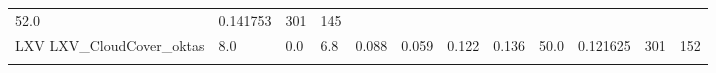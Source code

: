 \documentclass[11pt]{article}
\begin{document}
\begin{longtable}[]{@{}llllllllllll@{}}
\begin{minipage}[t]{0.05\columnwidth}
52.0\strut
\end{minipage} & \begin{minipage}[t]{0.05\columnwidth}\raggedright\strut
0.141753\strut
\end{minipage} & \begin{minipage}[t]{0.05\columnwidth}\raggedright\strut
301\strut
\end{minipage} & \begin{minipage}[t]{0.07\columnwidth}\raggedright\strut
145\strut
\end{minipage}\tabularnewline
\begin{minipage}[t]{0.18\columnwidth}\raggedright\strut
LXV LXV\_CloudCover\_oktas\strut
\end{minipage} & \begin{minipage}[t]{0.04\columnwidth}\raggedright\strut
8.0\strut
\end{minipage} & \begin{minipage}[t]{0.04\columnwidth}\raggedright\strut
0.0\strut
\end{minipage} & \begin{minipage}[t]{0.04\columnwidth}\raggedright\strut
6.8\strut
\end{minipage} & \begin{minipage}[t]{0.04\columnwidth}\raggedright\strut
0.088\strut
\end{minipage} & \begin{minipage}[t]{0.05\columnwidth}\raggedright\strut
0.059\strut
\end{minipage} & \begin{minipage}[t]{0.04\columnwidth}\raggedright\strut
0.122\strut
\end{minipage} & \begin{minipage}[t]{0.04\columnwidth}\raggedright\strut
0.136\strut
\end{minipage} & \begin{minipage}[t]{0.05\columnwidth}\raggedright\strut
50.0\strut
\end{minipage} & \begin{minipage}[t]{0.05\columnwidth}\raggedright\strut
0.121625\strut
\end{minipage} & \begin{minipage}[t]{0.05\columnwidth}\raggedright\strut
301\strut
\end{minipage} & \begin{minipage}[t]{0.07\columnwidth}\raggedright\strut
152\strut
\end{minipage}\tabularnewline
\begin{minipage}[t]{0.18\columnwidth}\raggedright\strut

\end{minipage}
\end{longtable}
\end{document}
